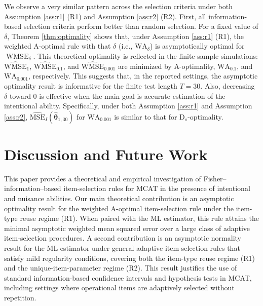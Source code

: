 \documentclass[12pt]{article}
\begin{document}
We observe a very similar pattern across the selection criteria under both Assumption \ref{ass:r1} (R1) and Assumption \ref{ass:r2} (R2). First, all information-based selection criteria perform better than random selection. For a fixed value of $\delta$, Theorem \ref{thm:optimality} shows that, under Assumption \ref{ass:r1} (R1), the weighted A-optimal rule with that $\delta$ (i.e., $\mathrm{WA}_{\delta}$) is asymptotically optimal for $\operatorname{WMSE}_{\delta}$. This theoretical optimality is reflected in the finite-sample simulations: $\widehat{\mathrm{WMSE}}_1$, $\widehat{\mathrm{WMSE}}_{0.1}$, and $\widehat{\mathrm{WMSE}}_{0.001}$ are minimized by A-optimality, $\mathrm{WA}_{0.1}$, and $\mathrm{WA}_{0.001}$, respectively. This suggests that, in the reported settings, the asymptotic optimality result is informative for the finite test length $T = 30$. Also, decreasing $\delta$ toward $0$ is effective when the main goal is accurate estimation of the intentional ability. Specifically, under both Assumption \ref{ass:r1} and Assumption \ref{ass:r2}, $\widehat{\mathrm{MSE}}_{I}(\hat{\boldsymbol{\theta}}_{1,30})$ for $\mathrm{WA}_{0.001}$ is similar to that for $\mathrm{D}_s$-optimality.   



\section{Discussion and Future Work} \label{sec:discuss} 
This paper provides a theoretical and empirical investigation of Fisher--information--based item-selection rules for MCAT in the presence of intentional and nuisance abilities. Our main theoretical contribution is an asymptotic optimality result for the weighted A-optimal item-selection rule under the item-type reuse regime (R1). When paired with the ML estimator, this rule attains the minimal asymptotic weighted mean squared error over a large class of adaptive item-selection procedures. A second contribution is an asymptotic normality result for the ML estimator under general adaptive item-selection rules that satisfy mild regularity conditions, covering both the item-type reuse regime (R1) and the unique-item-parameter regime (R2). This result justifies the use of standard information-based confidence intervals and hypothesis tests in MCAT, including settings where operational items are adaptively selected without repetition.
\end{document}
